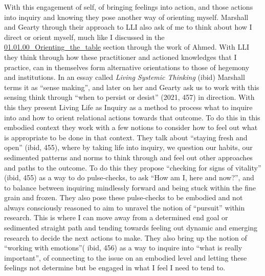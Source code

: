 With this engagement of self, of bringing feelings into action, and
those actions into inquiry and knowing they pose another way of
orienting myself. Marshall and Gearty through their approach to LLI also
ask of me to think about how I direct or orient myself, much like I
discussed in the
\href{../../01_Disability_justice_and_life_affirmation_flipping_the_table/sections/01.01.00_Orienting_the_table.md}{01.01.00\_Orienting\_the\_table}
section through the work of Ahmed. With LLI they think through how these
practitioner and actioned knowledges that I practice, can in themselves
form alternative orientations to those of hegemony and institutions. In
an essay called \emph{Living Systemic Thinking} (ibid) Marshall terms it
as ``sense making'', and later on her and Gearty ask us to work with
this sensing think through ``when to persist or desist'' (2021, 457) in
direction. With this they present Living Life as Inquiry as a method to
process what to inquire into and how to orient relational actions
towards that outcome. To do this in this embodied context they work with
a few notions to consider how to feel out what is appropriate to be done
in that context. They talk about ``staying fresh and open'' (ibid, 455),
where by taking life into inquiry, we question our habits, our
sedimented patterns and norms to think through and feel out other
approaches and paths to the outcome. To do this they propose ``checking
for signs of vitality'' (ibid, 455) as a way to do pulse-checks, to ask
``How am I, here and now?'', and to balance between inquiring mindlessly
forward and being stuck within the fine grain and frozen. They also pose
these pulse-checks to be embodied and not always consciously reasoned to
aim to unravel the notion of ``pursuit'' within research. This is where
I can move away from a determined end goal or sedimented straight path
and tending towards feeling out dynamic and emerging research to decide
the next actions to make. They also bring up the notion of ``working
with emotions''( ibid, 456) as a way to inquire into ``what is really
important'', of connecting to the issue on an embodied level and letting
these feelings not determine but be engaged in what I feel I need to
tend to.


